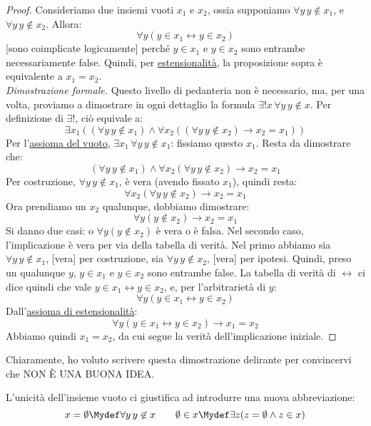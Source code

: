 \documentclass[11pt]{scrartcl}
\begin{document}
\begin{proof}
Consideriamo due insiemi vuoti $x_1$ e $x_2$, ossia supponiamo $\forall y \, y \not\in x_1$, e $\forall y \, y \not \in x_2$. Allora:
\[ \forall y (y \in x_1 \leftrightarrow y \in x_2)
	\]
[sono coimplicate logicamente] perché $y \in x_1$ e $y \in x_2$ sono entrambe necessariamente false. Quindi, per \hyperref[ax2]{estensionalità}, la proposizione sopra è equivalente a $x_1 = x_2$.\\
\emph{Dimostrazione formale.} Questo livello di pedanteria non è necessario, ma, per una volta, proviamo a dimostrare in ogni dettaglio la formula $\exists ! x \, \forall y \, y \not\in x$. Per definizione di $\exists !$, ciò equivale a:
\[ \exists x_1 ((\forall y \, y \not \in x_1) \land \forall x_2 ((\forall y \, y \not \in x_2) \rightarrow x_2 = x_1))
	\]
Per l'\hyperref[ax1]{assioma del vuoto}, $\exists x_1 \, \forall y \, y \not \in x_1$: fissiamo questo $x_1$. Resta da dimostrare che:
\[ (\forall y \, y \not \in x_1) \land \forall x_2(\forall y \, y \not \in x_2) \rightarrow x_2 = x_1
	\]
Per costruzione, $\forall y \, y \not\in x_1$, è vera (avendo fissato $x_1$), quindi resta:
\[ \forall x_2 (\forall y \, y \not \in x_2) \rightarrow x_2 = x_1
	\]
Ora prendiamo un $x_2$ qualunque, dobbiamo dimostrare:
\[ \forall y (y \not \in x_2) \rightarrow x_2 = x_1
	\]
Si danno due casi: o $\forall y (y \not \in x_2)$ è vera o è falsa. Nel secondo caso, l'implicazione è vera per via della tabella di verità. Nel primo abbiamo sia $\forall y \, y \not \in x_1$, [vera] per
costruzione, sia $\forall y \, y \not \in x_2$, [vera] per ipotesi. Quindi, preso un qualunque $y$, $y \in x_1$ e $y \in x_2$ sono entrambe false. La tabella di verità di $\leftrightarrow$ ci dice quindi che vale $y \in x_1 \leftrightarrow y \in x_2$, e, per 
l'arbitrarietà di $y$:
\[ \forall y (y \in x_1 \leftrightarrow y \in x_2)
	\]
Dall'\hyperref[ax2]{assioma di estensionalità}:
\[ \forall y (y \in x_1 \leftrightarrow y \in x_2) \rightarrow x_1 = x_2
	\]
Abbiamo quindi $x_1 = x_2$, da cui segue la verità dell'implicazione iniziale.
\end{proof}

Chiaramente, ho voluto scrivere questa dimostrazione delirante per convincervi che NON È UNA BUONA IDEA.

\begin{notation}
L'unicità dell'insieme vuoto ci giustifica ad introdurre una nuova abbreviazione:
\[ x = \emptyset \Mydef \forall y \, y \not\in x \qquad \emptyset \in x \Mydef \exists z (z = \emptyset \land z \in x)
	\]
\end{notation}
\end{document}
